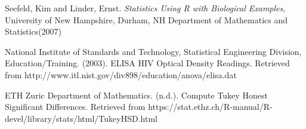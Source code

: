 \begin{thebibliography}{99}

 Seefeld, Kim and Linder, Ernst. \emph{Statistics Using R with Biological Examples}, University of New Hampshire, Durham, NH Department of Mathematics and Statistics(2007)

 National Institute of Standards and Technology, Statistical Engineering Division, Education/Training. (2003). ELISA HIV Optical Density Readings. Retrieved from http://www.itl.nist.gov/div898/education/anova/elisa.dat

 ETH Zuric Department of Mathematics. (n.d.). Compute Tukey Honest Significant Differences. Retrieved from https://stat.ethz.ch/R-manual/R-devel/library/stats/html/TukeyHSD.html
 
\end{thebibliography}

